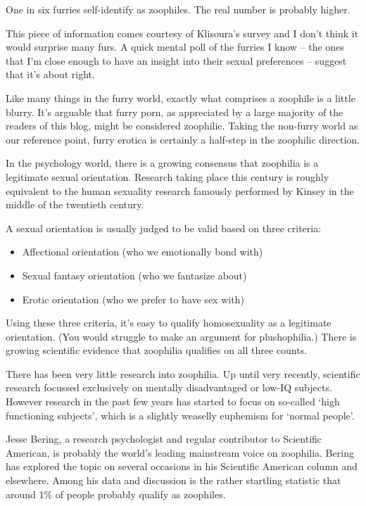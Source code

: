 
One in six furries self-identify as zoophiles. The real number is probably higher.

This piece of information comes courtesy of Klisoura's survey and I don't think it would surprise many furs. A quick mental poll of the furries I know -- the ones that I'm close enough to have an insight into their sexual preferences -- suggest that it's about right.

Like many things in the furry world, exactly what comprises a zoophile is a little blurry. It's arguable that furry porn, as appreciated by a large majority of the readers of this blog, might be considered zoophilic. Taking the non-furry world as our reference point, furry erotica is certainly a half-step in the zoophilic direction.

In the psychology world, there is a growing consensus that zoophilia is a legitimate sexual orientation. Research taking place this century is roughly equivalent to the human sexuality research famously performed by Kinsey in the middle of the twentieth century.

A sexual orientation is usually judged to be valid based on three criteria:

\begin{itemize}
  \item Affectional orientation (who we emotionally bond with)
  \item Sexual fantasy orientation (who we fantasize about)
  \item Erotic orientation (who we prefer to have sex with)
\end{itemize}

Using these three criteria, it's easy to qualify homosexuality as a legitimate orientation. (You would struggle to make an argument for plushophilia.) There is growing scientific evidence that zoophilia qualifies on all three counts.

There has been very little research into zoophilia. Up until very recently, scientific research focussed exclusively on mentally disadvantaged or low-IQ subjects. However research in the past few years has started to focus on so-called ‘high functioning subjects', which is a slightly weaselly euphemism for ‘normal people'.

Jesse Bering, a research psychologist and regular contributor to Scientific American, is probably the world's leading mainstream voice on zoophilia. Bering has explored the topic on several occasions in his Scientific American column and elsewhere. Among his data and discussion is the rather startling statistic that around 1\% of people probably qualify as zoophiles.


